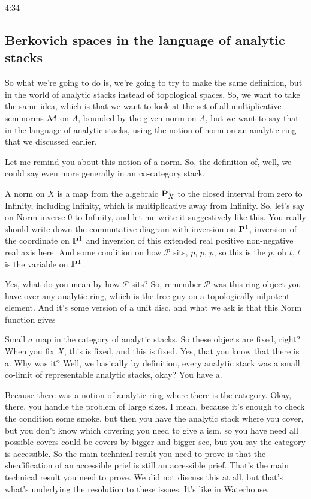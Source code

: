 \begin{unfinished}{4:34}
\begin{example}
\begin{example}
\begin{example}
\subsection{Berkovich spaces in the language of analytic stacks}
So what we're going to do is, we're going to try to make the same definition, but in the world of analytic stacks instead of topological spaces. So, we want to take the same idea, which is that we want to look at the set of all multiplicative seminorms $\BerkSpec$ on $A$, bounded by the given norm on $A$, but we want to say that in the language of analytic stacks, using the notion of norm on an analytic ring that we discussed earlier.

Let me remind you about this notion of a norm. So, the definition of, well, we could say even more generally in an $\infty$-category stack. 


A norm on $X$ is a map from the algebraic $\P^1_X$ to the closed interval from zero to Infinity, including Infinity, which is multiplicative away from Infinity. So, let's say on Norm inverse $0$ to Infinity, and let me write it suggestively like this. You really should write down the commutative diagram with inversion on $\P^1$, inversion of the coordinate on $\P^1$ and inversion of this extended real positive non-negative real axis here. And some condition on how $\mathcal{P}$ sits, $p$, $p$, $p$, so this is the $p$, oh $t$, $t$ is the variable on $\P^1$.

Yes, what do you mean by how $\mathcal{P}$ sits? So, remember $\mathcal{P}$ was this ring object you have over any analytic ring, which is the free guy on a topologically nilpotent element. And it's some version of a unit disc, and what we ask is that this Norm function gives

Small $a$ map in the category of analytic stacks. So these objects are fixed, right? When you fix $X$, this is fixed, and this is fixed. Yes, that you know that there is a. Why was it? Well, we basically by definition, every analytic stack was a small co-limit of representable analytic stacks, okay? You have a.

Because there was a notion of analytic ring where there is the category. Okay, there, you handle the problem of large sizes. I mean, because it's enough to check the condition some smoke, but then you have the analytic stack where you cover, but you don't know which covering you need to give a ism, so you have need all possible covers could be covers by bigger and bigger see, but you say the category is accessible. So the main technical result you need to prove is that the sheafification of an accessible prief is still an accessible prief. That's the main technical result you need to prove. We did not discuss this at all, but that's what's underlying the resolution to these issues. It's like in Waterhouse.


\end{example}
\end{example}
\end{example}
\end{unfinished}
